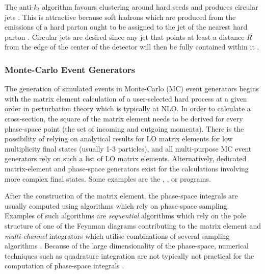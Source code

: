 The anti-$k_t$ algorithm favours clustering around hard seeds and produces circular jets \cite{Cacciari:2008gp}. This is attractive because soft hadrons which are produced from the emissions of a hard parton ought to be assigned to the jet of the nearest hard parton \cite{Atlas:Catani}. Circular jets are desired since any jet that points at least a distance $R$ from the edge of the center of the detector will then be fully contained within it \cite{Atlas:Salam2009}.

\subsubsection{Monte-Carlo Event Generators}
The generation of simulated events in Monte-Carlo (MC) event generators begins with the matrix element calculation of a user-selected hard process at a given order in perturbation theory which is typically at NLO. In order to calculate a cross-section, the square of the matrix element needs to be derived for every phase-space point (the set of incoming and outgoing momenta). There is the possibility of relying on analytical results for LO matrix elements for low multiplicity final states (usually 1-3 particles), and all multi-purpose MC event generators rely on such a list of LO matrix elements. Alternatively, dedicated matrix-element and phase-space generators exist for the calculations involving more complex final states. Some examples are the \ALPGEN \cite{Theory:alpgen}, \AMEGIC \cite{VBSWy:amegic}, or \COMIX \cite{Insitu:comix} programs.%

After the construction of the matrix element, the phase-space integrals are usually computed using algorithms which rely on phase-space sampling. Examples of such algorithms are \textit{sequential} algorithms which rely on the pole structure of one of the Feynman diagrams contributing to the matrix element \cite{Theory:sequential} and \textit{multi-channel} integrators which utilise combinations of several sampling algorithms \cite{Theory:multichannel}. Because of the large dimensionality of the phase-space, numerical techniques such as quadrature integration are not typically not practical for the computation of phase-space integrals \cite{Buckley:evgens}.

